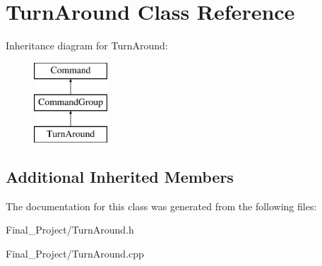 \hypertarget{classTurnAround}{\section{Turn\-Around Class Reference}
\label{classTurnAround}
}
Inheritance diagram for Turn\-Around\-:\begin{figure}[H]
\begin{center}
\leavevmode
\includegraphics[height=3.000000cm]{classTurnAround}
\end{center}
\end{figure}
\subsection*{Additional Inherited Members}


The documentation for this class was generated from the following files\-:\begin{DoxyCompactItemize}
\item 
Final\-\_\-\-Project/Turn\-Around.\-h\item 
Final\-\_\-\-Project/Turn\-Around.\-cpp\end{DoxyCompactItemize}
